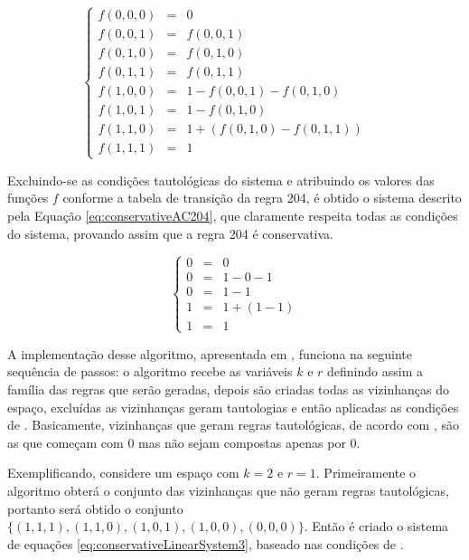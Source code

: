 	\begin{equation}
	\left\{\begin{matrix}
	 f(0,0,0) & = & 0 		& &\\ 
	 f(0,0,1) & = & f(0,0,1)& & \\ 
	 f(0,1,0) & = & f(0,1,0)& & \\ 
	 f(0,1,1) & = & f(0,1,1)& & \\ 
	 f(1,0,0) & = & 1 - f(0,0,1) - f(0,1,0) \\ 
	 f(1,0,1) & = & 1 - f(0,1,0) \\ 
	 f(1,1,0) & = & 1 + (f(0,1,0) - f(0,1,1))\\ 
	 f(1,1,1) & = & 1 & &
	\end{matrix}\right.
	\label{eq:conservativeLinearSystem2}
	\end{equation}

	Excluindo-se as condições tautológicas do sistema e atribuindo os valores das funções $f$ conforme a tabela de transição da regra 204, é obtido o sistema descrito pela Equação \ref{eq:conservativeAC204}, que claramente respeita todas as condições do sistema, provando assim que a regra 204 é conservativa.

	\begin{equation}
	\left\{\begin{matrix}
	 0 & = & 0 \\ 
	 0 & = & 1 - 0 - 1 \\ 
	 0 & = & 1 - 1 \\ 
	 1 & = & 1 + (1 - 1)\\ 
	 1 & = & 1 
	\end{matrix}\right.
	\label{eq:conservativeAC204}
	\end{equation}

	A implementação desse algoritmo, apresentada em \cite{deOliveira2014}, funciona na seguinte sequência de passos: o algoritmo recebe as variáveis $k$ e $r$ definindo assim a família das regras que serão geradas, depois são criadas todas as vizinhanças do espaço, excluídas as vizinhanças geram tautologias e então aplicadas as condições de . Basicamente, vizinhanças que geram regras tautológicas, de acordo com \cite{Schranko2010}, são as que começam com 0 mas não sejam compostas apenas por 0.

	Exemplificando, considere um espaço com $k=2$ e $r=1$. Primeiramente o algoritmo obterá o conjunto das vizinhanças que não geram regras tautológicas, portanto será obtido o conjunto $\{(1,1,1),(1,1,0),(1,0,1),(1,0,0),(0,0,0)\}$. Então é criado o sistema de equações \ref{eq:conservativeLinearSystem3}, baseado nas condições de .

